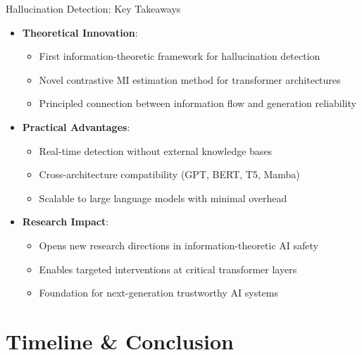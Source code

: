 \documentclass[aspectratio=169]{beamer}
\begin{document}
\begin{frame}{Hallucination Detection: Key Takeaways}
\begin{itemize}
    \item \textbf{Theoretical Innovation}:
    \begin{itemize}
        \item First information-theoretic framework for hallucination detection
        \item Novel contrastive MI estimation method for transformer architectures
        \item Principled connection between information flow and generation reliability
    \end{itemize}
    \item \textbf{Practical Advantages}:
    \begin{itemize}
        \item Real-time detection without external knowledge bases
        \item Cross-architecture compatibility (GPT, BERT, T5, Mamba)
        \item Scalable to large language models with minimal overhead
    \end{itemize}
    \item \textbf{Research Impact}:
    \begin{itemize}
        \item Opens new research directions in information-theoretic AI safety
        \item Enables targeted interventions at critical transformer layers
        \item Foundation for next-generation trustworthy AI systems
    \end{itemize}
\end{itemize}
\end{frame}

\section{Timeline \& Conclusion}
\end{document}
